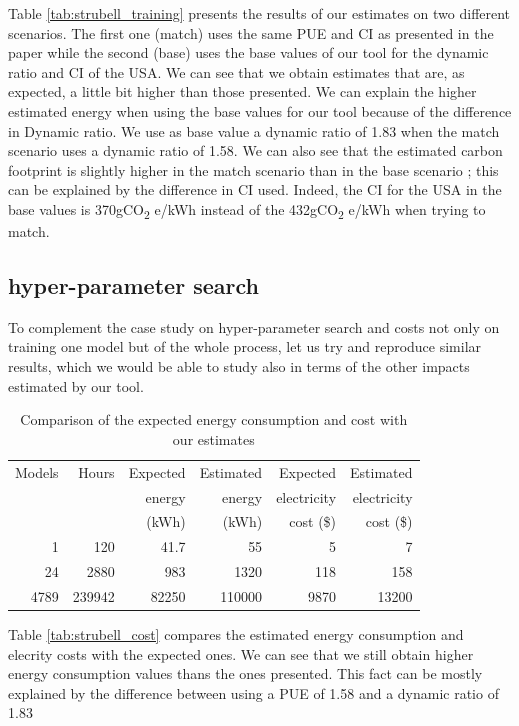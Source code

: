 \documentclass[11pt]{article}
\begin{document}
Table \ref{tab:strubell_training} presents the results of our
estimates on two different scenarios. The first one (match) uses the
same \gls{PUE} and \gls{CI} as presented in the paper while the second
(base) uses the base values of our tool for the dynamic ratio and \gls{CI} of the USA. We can see that we obtain estimates that are, as expected, a little
bit higher than those presented.
We can explain the higher estimated energy when using the base values
for our tool because of the difference in Dynamic ratio. We use as
base value a dynamic ratio of 1.83 when the match scenario uses a
dynamic ratio of 1.58. We can also see that the estimated carbon
footprint is slightly higher in the match scenario than in the base
scenario ; this can be explained by the difference in \gls{CI}
used. Indeed, the \gls{CI} for the USA in the base values
is 370gCO\textsubscript{2} e/kWh instead of the 432gCO\textsubscript{2} e/kWh when trying to match.

\subsection{hyper-parameter search}
\label{sec:orgaa7d056}

To complement the case study on hyper-parameter search and costs not
only on training one model but of the whole process, let us try and
reproduce similar results, which we would be able to study also in
terms of the other impacts estimated by our tool.

\begin{table}[htbp]
\caption{Comparison of the expected energy consumption and cost with our estimates}
\centering
\begin{tabular}{rrrrrr}
Models & Hours & Expected & Estimated & Expected & Estimated\\
 &  & energy & energy & electricity & electricity\\
 &  & (kWh) & (kWh) & cost (\$) & cost (\$)\\
\hline
1 & 120 & 41.7 & 55 & 5 & 7\\
24 & 2880 & 983 & 1320 & 118 & 158\\
4789 & 239942 & 82250 & 110000 & 9870 & 13200\\
\end{tabular}
\end{table}

Table \ref{tab:strubell_cost} compares the estimated energy consumption
and elecrity costs with the expected ones. We can see that we still obtain higher energy consumption  values thans
the ones presented. This fact can be mostly explained by the
difference between using a \gls{PUE} of 1.58 and a dynamic ratio of 1.83
\end{document}

